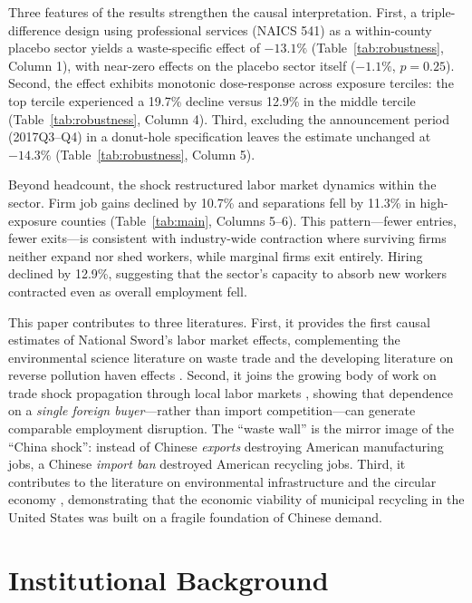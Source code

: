 \documentclass[12pt]{article}
\begin{document}
Three features of the results strengthen the causal interpretation. First, a triple-difference design using professional services (NAICS 541) as a within-county placebo sector yields a waste-specific effect of $-13.1\%$ (Table~\ref{tab:robustness}, Column 1), with near-zero effects on the placebo sector itself ($-1.1\%$, $p = 0.25$). Second, the effect exhibits monotonic dose-response across exposure terciles: the top tercile experienced a 19.7\% decline versus 12.9\% in the middle tercile (Table~\ref{tab:robustness}, Column 4). Third, excluding the announcement period (2017Q3--Q4) in a donut-hole specification leaves the estimate unchanged at $-14.3\%$ (Table~\ref{tab:robustness}, Column 5).

Beyond headcount, the shock restructured labor market dynamics within the sector. Firm job gains declined by 10.7\% and separations fell by 11.3\% in high-exposure counties (Table~\ref{tab:main}, Columns 5--6). This pattern---fewer entries, fewer exits---is consistent with industry-wide contraction where surviving firms neither expand nor shed workers, while marginal firms exit entirely. Hiring declined by 12.9\%, suggesting that the sector's capacity to absorb new workers contracted even as overall employment fell.

This paper contributes to three literatures. First, it provides the first causal estimates of National Sword's labor market effects, complementing the environmental science literature on waste trade \citep{Brooks2018, Huang2020, Yamaguchi2022} and the developing literature on reverse pollution haven effects \citep{Kellenberg2012}. Second, it joins the growing body of work on trade shock propagation through local labor markets \citep{Autor2013, DixCarneiro2017, Pierce2020}, showing that dependence on a \textit{single foreign buyer}---rather than import competition---can generate comparable employment disruption. The ``waste wall'' is the mirror image of the ``China shock'': instead of Chinese \textit{exports} destroying American manufacturing jobs, a Chinese \textit{import ban} destroyed American recycling jobs. Third, it contributes to the literature on environmental infrastructure and the circular economy \citep{Kinnaman2014, Walls2011, Callan2006}, demonstrating that the economic viability of municipal recycling in the United States was built on a fragile foundation of Chinese demand.

\section{Institutional Background}
\end{document}
